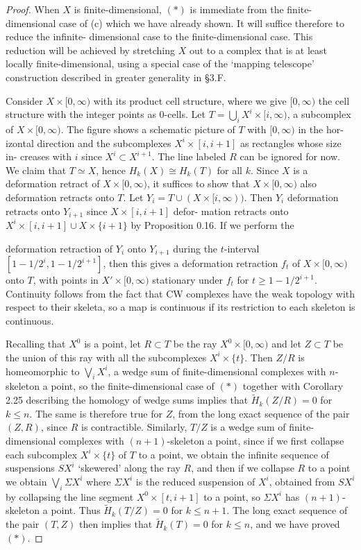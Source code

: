 \begin{proof}
When $X$ is finite-dimensional, $(*)$ is immediate from the finite-dimensional case
of (c) which we have already shown. It will suffice therefore to reduce the infinite-
dimensional case to the finite-dimensional case. This reduction will be achieved by
stretching $X$ out to a complex that is at least locally finite-dimensional, using a special
case of the `mapping telescope' construction described in greater generality in \S 3.F.

Consider $X \times [0, \infty)$ with its product cell structure,
where we give $[0, \infty)$ the cell structure with the integer
points as 0-cells. Let $T = \bigcup_i X^i \times [i, \infty)$, a subcomplex
of $X \times [0, \infty)$. The figure shows a schematic picture of $T$ with $[0, \infty)$ in the hor-
izontal direction and the subcomplexes $X^i \times [i, i+1]$ as rectangles whose size in-
creases with $i$ since $X^i \subset X^{i+1}$. The line labeled $R$ can be ignored for now. We claim
that $T \simeq X$, hence $H_k(X) \cong H_k(T)$ for all $k$. Since $X$ is a deformation retract of
$X \times [0, \infty)$, it suffices to show that $X \times [0, \infty)$ also deformation retracts onto $T$. Let
$Y_i = T \cup (X \times [i, \infty))$. Then $Y_i$ deformation retracts onto $Y_{i+1}$ since $X \times [i, i+1]$ defor-
mation retracts onto $X^i \times [i, i+1] \cup X \times \{i+1\}$ by Proposition 0.16. If we perform the

deformation retraction of $Y_i$ onto $Y_{i+1}$ during the $t$-interval $[1 - 1/2^i, 1 - 1/2^{i+1}]$, then this gives a deformation retraction $f_t$ of $X \times [0, \infty)$ onto $T$, with points in $X' \times [0, \infty)$ stationary under $f_t$ for $t \geq 1 - 1/2^{i+1}$. Continuity follows from the fact that CW complexes have the weak topology with respect to their skeleta, so a map is continuous if its restriction to each skeleton is continuous.

Recalling that $X^0$ is a point, let $R \subset T$ be the ray $X^0 \times [0, \infty)$ and let $Z \subset T$ be the union of this ray with all the subcomplexes $X^i \times \{t\}$. Then $Z/R$ is homeomorphic to $\bigvee_i X^i$, a wedge sum of finite-dimensional complexes with $n$-skeleton a point, so the finite-dimensional case of $(*)$ together with Corollary 2.25 describing the homology of wedge sums implies that $\widetilde{H}_k(Z/R) = 0$ for $k \leq n$. The same is therefore true for $Z$, from the long exact sequence of the pair $(Z, R)$, since $R$ is contractible. Similarly, $T/Z$ is a wedge sum of finite-dimensional complexes with $(n+1)$-skeleton a point, since if we first collapse each subcomplex $X^i \times \{t\}$ of $T$ to a point, we obtain the infinite sequence of suspensions $SX^i$ `skewered' along the ray $R$, and then if we collapse $R$ to a point we obtain $\bigvee_i \Sigma X^i$ where $\Sigma X^i$ is the reduced suspension of $X^i$, obtained from $SX^i$ by collapsing the line segment $X^0 \times [t, i+1]$ to a point, so $\Sigma X^i$ has $(n+1)$-skeleton a point. Thus $\widetilde{H}_k(T/Z) = 0$ for $k \leq n+1$. The long exact sequence of the pair $(T,Z)$ then implies that $\widetilde{H}_k(T) = 0$ for $k \leq n$, and we have proved $(*)$.
\end{proof}
